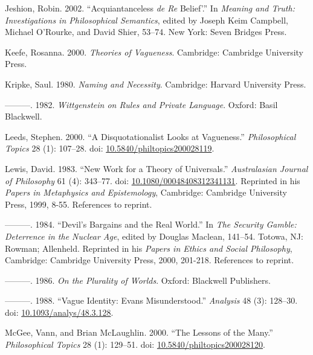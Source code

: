 \documentclass[
  10pt,
  letterpaper,
  DIV=11,
  numbers=noendperiod,
  twoside]{scrartcl}
\newlength{\cslhangindent}
\newenvironment{CSLReferences}[2] %
 {\begin{list}{}{%
  \setlength{\itemindent}{0pt}
  \setlength{\leftmargin}{0pt}
  \setlength{\parsep}{0pt}
  \ifodd #1
   \setlength{\leftmargin}{\cslhangindent}
   \setlength{\itemindent}{-1\cslhangindent}
  \fi
  \setlength{\itemsep}{#2\baselineskip}}}
 {\end{list}}
\begin{document}
\begin{CSLReferences}{1}{0}
Jeshion, Robin. 2002. {``Acquiantanceless \emph{de Re} Belief'.''} In
\emph{Meaning and Truth: Investigations in Philosophical Semantics},
edited by Joseph Keim Campbell, Michael O'Rourke, and David Shier,
53--74. New York: Seven Bridges Press.

Keefe, Rosanna. 2000. \emph{Theories of Vagueness}. Cambridge: Cambridge
University Press.

Kripke, Saul. 1980. \emph{Naming and Necessity}. Cambridge: Harvard
University Press.

---------. 1982. \emph{Wittgenstein on Rules and Private Language}.
Oxford: Basil Blackwell.

Leeds, Stephen. 2000. {``A Disquotationalist Looks at Vagueness.''}
\emph{Philosophical Topics} 28 (1): 107--28. doi:
\href{https://doi.org/10.5840/philtopics200028119}{10.5840/philtopics200028119}.

Lewis, David. 1983. {``New Work for a Theory of Universals.''}
\emph{Australasian Journal of Philosophy} 61 (4): 343--77. doi:
\href{https://doi.org/10.1080/00048408312341131}{10.1080/00048408312341131}.
Reprinted in his \emph{Papers in Metaphysics and Epistemology},
Cambridge: Cambridge University Press, 1999, 8-55. References to
reprint.

---------. 1984. {``Devil's Bargains and the Real World.''} In \emph{The
Security Gamble: Deterrence in the Nuclear Age}, edited by Douglas
Maclean, 141--54. Totowa, NJ: Rowman; Allenheld. Reprinted in his
\emph{Papers in Ethics and Social Philosophy}, Cambridge: Cambridge
University Press, 2000, 201-218. References to reprint.

---------. 1986. \emph{On the Plurality of Worlds}. Oxford: Blackwell
Publishers.

---------. 1988. {``Vague Identity: Evans Misunderstood.''}
\emph{Analysis} 48 (3): 128--30. doi:
\href{https://doi.org/10.1093/analys/48.3.128}{10.1093/analys/48.3.128}.

McGee, Vann, and Brian McLaughlin. 2000. {``The Lessons of the Many.''}
\emph{Philosophical Topics} 28 (1): 129--51. doi:
\href{https://doi.org/10.5840/philtopics200028120}{10.5840/philtopics200028120}.


\end{CSLReferences}
\end{document}
